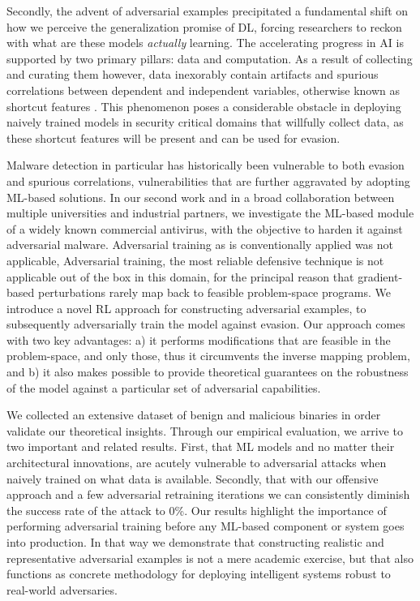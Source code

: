 Secondly, the advent of adversarial examples precipitated a fundamental shift on how we perceive the generalization promise of \gls{DL}, forcing researchers to reckon with what are these models \textit{actually} learning.
The accelerating progress in \gls{AI} is supported by two primary pillars: data and computation.
As a result of collecting and curating them however, data inexorably contain artifacts and spurious correlations between dependent and independent variables, otherwise known as shortcut features \cite{geirhos2020shortcut}.
This phenomenon poses a considerable obstacle in deploying naively trained models in security critical domains that willfully collect data, as these shortcut features will be present and can be used for evasion.

Malware detection in particular has historically been vulnerable to both evasion and spurious correlations, vulnerabilities that are further aggravated by adopting ML-based solutions.
In our second work and in a broad collaboration between multiple universities and industrial partners, we investigate the \gls{ML}-based module of a widely known commercial antivirus, with the objective to harden it against adversarial malware.
Adversarial training as is conventionally applied was not applicable,
Adversarial training, the most reliable defensive technique is not applicable out of the box in this domain, for the principal reason that gradient-based perturbations rarely map back to feasible problem-space programs. 
We introduce a novel \gls{RL} approach for constructing adversarial examples, to subsequently adversarially train the model against evasion.
Our approach comes with two key advantages: a) it performs modifications that are feasible in the problem-space, and only those, thus it circumvents the inverse mapping problem, and b) it also makes possible to provide theoretical guarantees on the robustness of the model against a particular set of adversarial capabilities.

We collected an extensive dataset of benign and malicious binaries in order validate our theoretical insights.
Through our empirical evaluation, we arrive to two important and related results.
First, that \gls{ML} models and no matter their architectural innovations, are acutely vulnerable to adversarial attacks when naively trained on what data is available.
Secondly, that with our offensive approach and a few adversarial retraining iterations we can consistently diminish the success rate of the attack to 0\%.
Our results highlight the importance of performing adversarial training before any ML-based component or system goes into production.
In that way we demonstrate that constructing realistic and representative adversarial examples is not a mere academic exercise, but that also functions as concrete methodology for deploying intelligent systems robust to real-world adversaries.

